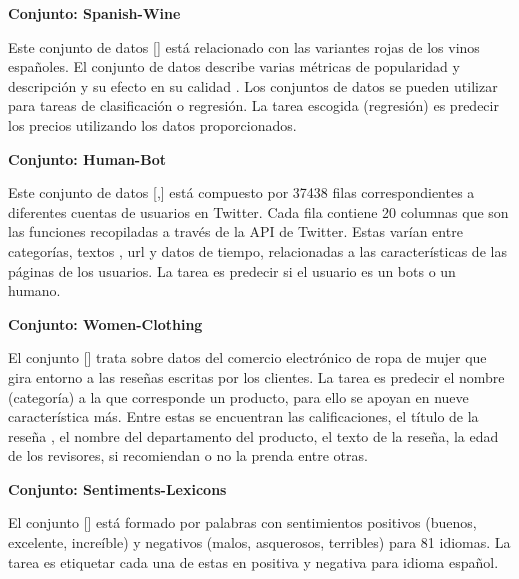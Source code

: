 \begin{annexes}
\begin{flushleft} 
    { \textbf{Conjunto: Spanish-Wine}}\label{description:wine}
\end{flushleft}

Este conjunto de datos [\cite{spanish-wine}] está relacionado con las variantes rojas de los vinos españoles. El conjunto de datos describe varias métricas de popularidad y descripción y 
su efecto en su calidad . Los conjuntos de datos se pueden utilizar para tareas de clasificación o regresión. La tarea escogida (regresión) es predecir los precios 
utilizando los datos proporcionados.

\begin{flushleft} 
    { \textbf{Conjunto: Human-Bot}}\label{description:human}
\end{flushleft}

Este conjunto de datos [\cite{human-bot},\cite{Human-Bot}] está compuesto por 37438 filas correspondientes a diferentes cuentas de usuarios en Twitter. Cada fila contiene 20 columnas que son las funciones 
recopiladas a través de la API de Twitter. Estas varían entre categorías, textos , url y datos de tiempo, relacionadas a las características de las páginas de los 
usuarios. La tarea es predecir si el usuario es un bots o un humano. 


\begin{flushleft} 
    { \textbf{Conjunto: Women-Clothing}}\label{description:women}
\end{flushleft}

El conjunto [\cite{women-clothing}] trata sobre datos del comercio electrónico de ropa de mujer que gira entorno a las reseñas escritas por los clientes. La tarea es predecir el nombre 
(categoría) a la que corresponde un producto, para ello se apoyan en nueve característica más. Entre estas se encuentran las calificaciones, el título de la reseña , 
el nombre del departamento del producto, el texto de la reseña, la edad de los revisores, si recomiendan o no la prenda entre otras. 

\begin{flushleft} 
    { \textbf{Conjunto: Sentiments-Lexicons}}\label{description:sentiments}
\end{flushleft}

El conjunto [\cite{sentiments-lexicons}] está formado por palabras con sentimientos positivos (buenos, excelente, increíble) y negativos (malos, asquerosos, terribles) 
para 81 idiomas. La tarea es etiquetar cada una de estas en positiva y negativa para idioma español. 


\end{annexes}
